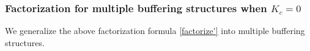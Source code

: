 \documentclass[ amsmath,amssymb,nofootinbib
]{revtex4-1}
\newtheorem{proposition}{Proposition}
\begin{document}
%
%


\subsubsection{Factorization for multiple buffering structures when $K_c =0$}
We generalize the above factorization formula \eqref{factorize'}  into multiple buffering structures.
\end{document}
